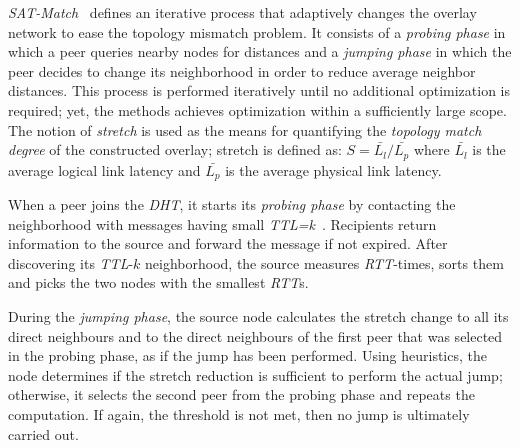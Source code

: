 \emph{SAT-Match}~\cite{RGJZ2004} defines an iterative process that 
adaptively changes the overlay network to ease the topology mismatch problem. 
It consists of a \emph{probing phase} in which a peer queries nearby nodes 
for distances and a \emph{jumping phase} in which the peer decides 
to change its neighborhood in order to reduce average neighbor distances. 
This process is performed iteratively
until no additional optimization is required; 
yet, the methods achieves optimization within a
sufficiently large scope.
The notion of \emph{stretch} is used as the means for quantifying 
the \emph{topology match degree} of the constructed overlay;
stretch is defined as: 
$S = \bar{L_l}/\bar{L_p}$ where $\bar{L_l}$ is the average logical link
latency and $\bar{L_p}$ is the average physical link latency.
% 

When a peer joins the \emph{DHT}, it starts 
its \emph{probing phase} by contacting the neighborhood with 
messages having small \emph{TTL=k}~\cite{jiang_lightflood_2008}. 
Recipients return information to the source and forward the message 
if not expired. 
After discovering its \emph{TTL}-$k$ neighborhood, 
the source measures \emph{RTT}-times, sorts them
and picks the two nodes with the smallest \emph{RTT}s.

During the \emph{jumping phase}, the source node calculates the 
stretch change to all its direct neighbours and to the direct neighbours
of the first peer that was selected in the probing phase, as if
the jump has been performed. 
Using heuristics, the node determines if the stretch
reduction is sufficient to perform the actual jump; 
otherwise, it selects the second peer from the probing phase 
and repeats the computation. If again, the
threshold is not met, then no jump is ultimately carried out.

